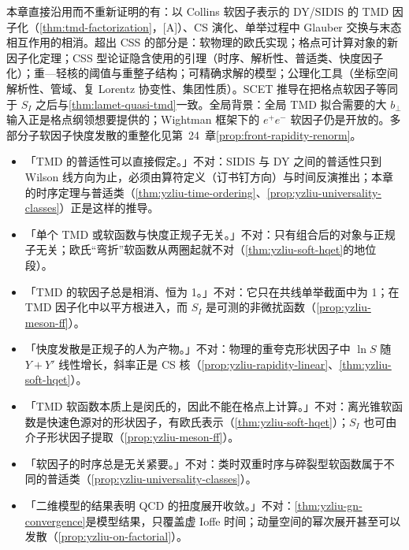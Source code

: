 \begin{remark}\label{rem:yzliu-relation-css}
本章直接沿用而不重新证明的有：以 Collins 软因子表示的 DY/SIDIS 的 TMD 因子化（\cref{thm:tmd-factorization}，[A]）、CS 演化、单举过程中 Glauber 交换与末态相互作用的相消。超出 CSS 的部分是：软物理的欧氏实现；格点可计算对象的新因子化定理；CSS 型论证隐含使用的引理（时序、解析性、普适类、快度因子化）；重—轻核的阈值与重整子结构；可精确求解的模型；公理化工具（坐标空间解析性、管域、复 Lorentz 协变性、集团性质）。SCET 推导\cite{Vladimirov:2020ofp,Ebert:2022fmh,delRio:2023pse}在把格点软因子等同于 $S_I$ 之后与\cref{thm:lamet-quasi-tmd}一致。全局背景：全局 TMD 拟合\cite{Scimemi:2019cmh}需要的大 $b_\perp$ 输入正是格点纲领想要提供的；Wightman 框架下的 $e^+e^-$ 软因子\cite{Collins:2023cuo}仍是开放的。多部分子软因子快度发散的重整化见第~24~章\cref{prop:front-rapidity-renorm}。
\end{remark}



\begin{tcolorbox}[enhanced,breakable,colback=gray!3!white,colframe=gray!45!black,boxrule=0.5pt,arc=2pt,left=4pt,right=4pt,top=2pt,bottom=2pt,title={常见误解},fonttitle=\bfseries\small]
\small
\begin{itemize}[leftmargin=1.2em,itemsep=1pt,topsep=1pt]
\item 「TMD 的普适性可以直接假定。」不对：SIDIS 与 DY 之间的普适性只到 Wilson 线方向为止，必须由算符定义（订书钉方向）与时间反演推出；本章的时序定理与普适类（\cref{thm:yzliu-time-ordering}、\cref{prop:yzliu-universality-classes}）正是这样的推导。
\item 「单个 TMD 或软函数与快度正规子无关。」不对：只有组合后的对象与正规子无关；欧氏“弯折”软函数从两圈起就不对（\cref{thm:yzliu-soft-hqet}的地位段）。
\item 「TMD 的软因子总是相消、恒为 1。」不对：它只在共线单举截面中为 1；在 TMD 因子化中以平方根进入，而 $S_I$ 是可测的非微扰函数（\cref{prop:yzliu-meson-ff}）。
\item 「快度发散是正规子的人为产物。」不对：物理的重夸克形状因子中 $\ln S$ 随 $Y+Y'$ 线性增长，斜率正是 CS 核（\cref{prop:yzliu-rapidity-linear}、\cref{thm:yzliu-soft-hqet}）。
\item 「TMD 软函数本质上是闵氏的，因此不能在格点上计算。」不对：离光锥软函数是快速色源对的形状因子，有欧氏表示（\cref{thm:yzliu-soft-hqet}）；$S_I$ 也可由介子形状因子提取（\cref{prop:yzliu-meson-ff}）。
\item 「软因子的时序总是无关紧要。」不对：类时双重时序与碎裂型软函数属于不同的普适类（\cref{prop:yzliu-universality-classes}）。
\item 「二维模型的结果表明 QCD 的扭度展开收敛。」不对：\cref{thm:yzliu-gn-convergence}是模型结果，只覆盖虚 Ioffe 时间；动量空间的幂次展开甚至可以发散（\cref{prop:yzliu-on-factorial}）。
\end{itemize}
\end{tcolorbox}

